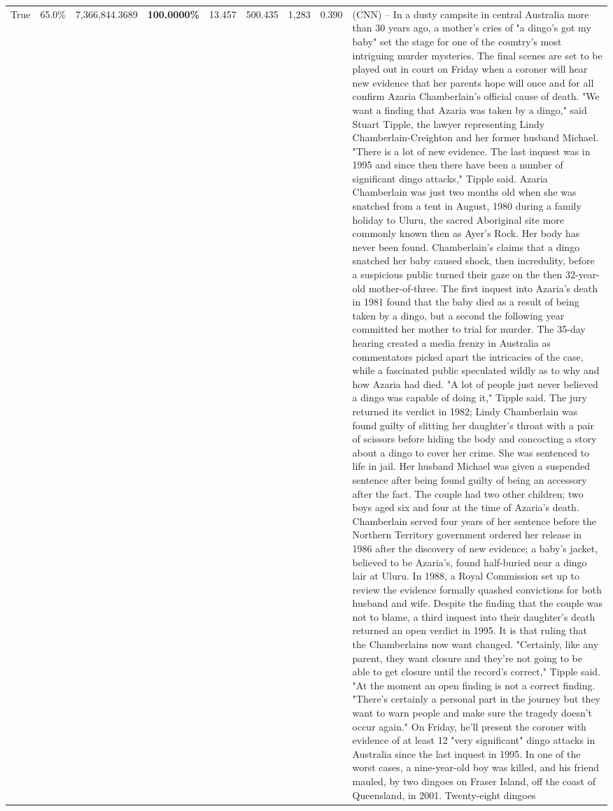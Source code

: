\begin{table}[H]
\begin{tabular}{lllrlllll}
True & 65.0\% & 7,366,844.3689 & \bfseries \color{red} 100.0000\% & 13.457 & 500.435 & 1,283 & 0.390 & (CNN) -- In a dusty campsite in central Australia more than 30 years ago, a mother's cries of "a dingo's got my baby" set the stage for one of the country's most intriguing murder mysteries. The final scenes are set to be played out in court on Friday when a coroner will hear new evidence that her parents hope will once and for all confirm Azaria Chamberlain's official cause of death. "We want a finding that Azaria was taken by a dingo," said Stuart Tipple, the lawyer representing Lindy Chamberlain-Creighton and her former husband Michael. "There is a lot of new evidence. The last inquest was in 1995 and since then there have been a number of significant dingo attacks," Tipple said. Azaria Chamberlain was just two months old when she was snatched from a tent in August, 1980 during a family holiday to Uluru, the sacred Aboriginal site more commonly known then as Ayer's Rock. Her body has never been found. Chamberlain's claims that a dingo snatched her baby caused shock, then incredulity, before a suspicious public turned their gaze on the then 32-year-old mother-of-three. The first inquest into Azaria's death in 1981 found that the baby died as a result of being taken by a dingo, but a second the following year committed her mother to trial for murder. The 35-day hearing created a media frenzy in Australia as commentators picked apart the intricacies of the case, while a fascinated public speculated wildly as to why and how Azaria had died. "A lot of people just never believed a dingo was capable of doing it," Tipple said. The jury returned its verdict in 1982; Lindy Chamberlain was found guilty of slitting her daughter's throat with a pair of scissors before hiding the body and concocting a story about a dingo to cover her crime. She was sentenced to life in jail. Her husband Michael was given a suspended sentence after being found guilty of being an accessory after the fact. The couple had two other children; two boys aged six and four at the time of Azaria's death. Chamberlain served four years of her sentence before the Northern Territory government ordered her release in 1986 after the discovery of new evidence; a baby's jacket, believed to be Azaria's, found half-buried near a dingo lair at Uluru. In 1988, a Royal Commission set up to review the evidence formally quashed convictions for both husband and wife. Despite the finding that the couple was not to blame, a third inquest into their daughter's death returned an open verdict in 1995. It is that ruling that the Chamberlains now want changed. "Certainly, like any parent, they want closure and they're not going to be able to get closure until the record's correct," Tipple said. "At the moment an open finding is not a correct finding. "There's certainly a personal part in the journey but they want to warn people and make sure the tragedy doesn't occur again." On Friday, he'll present the coroner with evidence of at least 12 "very significant" dingo attacks in Australia since the last inquest in 1995. In one of the worst cases, a nine-year-old boy was killed, and his friend mauled, by two dingoes on Fraser Island, off the coast of Queensland, in 2001. Twenty-eight dingoes 
\end{tabular}
\end{table}
